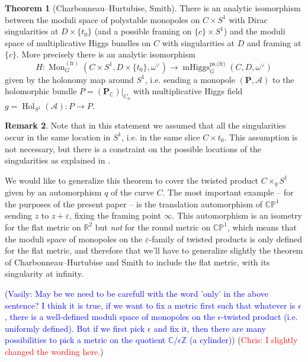 \documentclass[11pt, oneside, reqno]{amsart}
\theoremstyle{definition} \newtheorem{definition}{Definition}[section]
\newtheorem{theorem}[definition]{Theorem}
\theoremstyle{definition} \newtheorem{remark}[definition]{Remark}
\theoremstyle{definition} \newtheorem{remarks}[definition]{Remarks}
\theoremstyle{definition} \newtheorem{question}[definition]{Question}
\theoremstyle{definition} \newtheorem*{note}{Note}
\theoremstyle{definition} \newtheorem{example}[definition]{Example}
\theoremstyle{definition} \newtheorem{examples}[definition]{Examples}
\newcommand{\bb}[1]{\mathbb{#1}}
\newcommand{\mc}[1]{\mathcal{#1}}
\newcommand{\bo}[1]{\boldsymbol{#1}}
\newcommand{\CC}{\mathbb{C}}
\newcommand{\RR}{\mathbb{R}}
\newcommand{\eps}{\varepsilon}
\DeclareMathOperator{\mhiggs}{mHiggs}
\DeclareMathOperator{\mon}{Mon}
\DeclareMathOperator{\Hol}{Hol}
\newcommand{\fr}{\mathrm{fr}}
\newcommand{\chris}[1]{(\textcolor{red}{Chris: #1})}
\newcommand{\vasily}[1]{(\textcolor{blue}{Vasily: #1})}
\begin{document}
\begin{theorem}[Charbonneau--Hurtubise, Smith] \label{CHS_thm}
There is an analytic isomorphism between the moduli space of polystable monopoles on $C \times S^1$ with Dirac singularities at $D \times \{t_0\}$ (and a possible framing on $\{c\} \times S^1$) and the moduli space of multiplicative Higgs bundles on $C$ with singularities at $D$ and framing at $\{c\}$.  More precisely there is an analytic isomorphism
\[H \colon \mon^{(\fr)}_G(C \times S^1, D \times \{t_0\}, \omega^\vee) \to \mhiggs_G^{\text{ps,(fr)}}(C, D, \omega^\vee)\]
given by the holonomy map around $S^1$, i.e. sending a monopole $(\bo P, \mc A)$ to the holomorphic bundle $P = (\bo P_\CC)|_{C_0}$ with multiplicative Higgs field $g = \Hol_{S^1}(\mc A) \colon P \to P$.
\end{theorem}

\begin{remark}
Note that in this statement we assumed that all the singularities occur in the same location in $S^1$, i.e. in the same slice $C \times {t_0}$.  This assumption is not necessary, but there is a constraint on the possible locations of the singularities as explained in \cite[Proposition 3.5]{CharbonneauHurtubise}.  
\end{remark}

We would like to generalize this theorem to cover the twisted product $C \times_q S^1$ given by an automorphism $q$ of the curve $C$.  The most important example -- for the purposes of the present paper -- is the translation automorphism of $\bb{CP}^1$ sending $z$ to $z + \eps$, fixing the framing point $\infty$.  This automorphism is an isometry for the flat metric on $\RR^2$ but \emph{not} for the round metric on $\bb{CP}^1$, which means that the moduli space of monopoles on the $\eps$-family of twisted products is only defined for the flat metric, and therefore that we'll have to generalize slightly the theorem of Charbonneau--Hurtubise and Smith to include the flat metric, with its singularity at infinity.

\vasily{May be we need to be carefull with the word 'only' in the above
  sentence? I think it is true, if we want to fix a metric first such
  that whatever is $\epsilon$, there is a well-defined moduli space of monopoles
  on the $\epsilon$-twisted product (i.e. uniformly defined). But if we
  first pick $\epsilon$ and fix it,  then there are many possibilities
to pick a metric on the quotient $\mathbb{C}/\epsilon \mathbb{Z}$ (a cylinder)} \chris{I slightly changed the wording here.}
\end{document}
